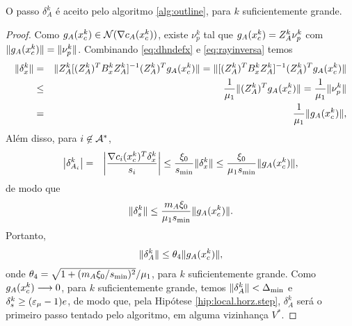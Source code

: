 \begin{lemma}
 O passo $\delta_A^k$ é aceito pelo algoritmo \ref{alg:outline}, para $k$
 suficientemente grande.
\end{lemma}
\begin{proof}
 Como $g_A(x_c^{k}) \in \mathcal{N}(\nabla c_A(x_c^{k}))$, existe $\nu_p^k$ tal que $g_A(x_c^{k}) =
 Z_A^k\nu_p^k$ com $\Vert g_A(x_c^{k})\Vert=\Vert \nu_p^k\Vert$. Combinando
 \eqref{eq:dhndefx} e \eqref{eq:rayinversa} temos
\begin{eqnarray}
 \norma{\delta_x^k} & = & \norma{Z_A^k[(Z_A^k)^TB_x^kZ_A^k]^{-1}(Z_A^k)^T\gAk{k}} =
 \norma{[(Z_A^k)^T B_x^k Z_A^k]^{-1}(Z_A^k)^T\gAk{k}} \nonumber \\
& \leq & \frac{1}{\mu_1}\norma{(Z_A^k)^T\gAk{k}} = \frac{1}{\mu_1}\norma{\nu_p^k} \nonumber \\ 
& = & \frac{1}{\mu_1}\norma{\gAk{k}},\visiblelbl{dxgAk}
\end{eqnarray}
Além disso, para $i \not\in \mathcal{A}^*$,
\begin{eqnarray*}
 \left| \delta_{A_i}^k\right| & = & \bigg|\frac{\nabla c_i (x_c^{k})^T\delta_x^k}{s_i}\bigg| \leq
 \frac{\xi_0}{s_{\min}}\Vert \delta_x^k\Vert \leq \frac{\xi_0}{\mu_1s_{\min}}\Vert g_A(x_c^{k})\Vert,
\end{eqnarray*}
de modo que
\begin{eqnarray}
 \norma{\delta_s^k} \leq \frac{m_A\xi_0}{\mu_1\smin}\norma{\gAk{k}}. \visiblelbl{dsgAk}
\end{eqnarray}
Portanto,
\begin{eqnarray}
 \norma{\delta_A^k} \leq \theta_4\norma{\gAk{k}}, \visiblelbl{eq:dhnlim}
\end{eqnarray}
onde $\theta_4 = \sqrt{1 + (m_A\xi_0/s_{\min})^2}/\mu_1$, para $k$ suficientemente grande. Como
 $g_A(x_c^{k})\longrightarrow 0$, para $k$ suficientemente grande, temos $\Vert \delta_A^k\Vert < \Delta_{\min}$
 e $\delta_s^k \geq (\varepsilon_{\mu} - 1)e$, de modo que, pela Hipótese
 \ref{hip:local.horz.step}, $\delta_A^k$ será o primeiro passo tentado pelo
 algoritmo, em alguma vizinhança $V^*$.


\end{proof}
